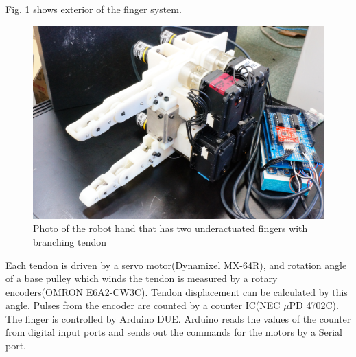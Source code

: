 \documentclass{llncs}
\begin{document}
Fig. \ref{pic:finger} shows exterior of the finger system.
	\begin{figure}[tb]
		\centering
		\includegraphics[width=.50\textwidth]{./figure/JPG/finger1.eps}
		\caption{Photo of the robot hand that has two underactuated fingers with branching tendon}
		\label{pic:finger}
	\end{figure}
Each tendon is driven by a servo motor(Dynamixel MX-64R), and
rotation angle of a base pulley which winds the tendon is measured by a rotary encoders(OMRON E6A2-CW3C).
Tendon displacement can be calculated by this angle.
Pulses from the encoder are counted by a counter IC(NEC $\mu$PD 4702C).
The finger is controlled by Arduino DUE.
Arduino reads the values of the counter from digital input ports
and sends out the commands for the motors by a Serial port.

\end{document}
